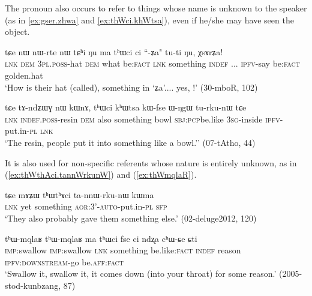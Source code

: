 The pronoun  also occurs to refer to things whose name is unknown to the speaker (as in \ref{ex:gser.zhwa} and \ref{ex:thWci.khWtsa}), even if he/she may have seen the object.
 
\begin{exe}
\ex \label{ex:gser.zhwa}
\gll tɕe nɯ nɯ-rte nɯ tɕʰi ŋu ma tʰɯci ci ``-ʑa" tu-ti ŋu, χsɤrʑa! \\
\textsc{lnk} \textsc{dem} \textsc{3pl}.\textsc{poss}-hat \textsc{dem} what be:\textsc{fact} \textsc{lnk} something \textsc{indef} {  ...} \textsc{ipfv}-say be:\textsc{fact} golden.hat \\
\glt `How is their hat (called), something in `ʑa'.... yes, !' (30-mboR, 102)
\end{exe}

\begin{exe}
\ex \label{ex:thWci.khWtsa}
\gll  tɕe tɤ-ndʑɯɣ nɯ kɯnɤ, tʰɯci kʰɯtsa kɯ-fse ɯ-ŋgɯ tu-rku-nɯ tɕe   \\
\textsc{lnk} \textsc{indef}.\textsc{poss}-resin \textsc{dem} also something bowl \textsc{sbj}:\textsc{pcp}be.like \textsc{3sg}-inside \textsc{ipfv}-put.in-\textsc{pl} \textsc{lnk}   \\
\glt `The resin, people put it into something like a bowl.'' (07-tAtho, 44)
\end{exe}

It is also used for non-specific referents whose nature is entirely unknown, as in  (\ref{ex:thWthAci.tannWrkunW}) and (\ref{ex:thWmqlaR}).

\begin{exe}
\ex \label{ex:thWthAci.tannWrkunW}
\gll   tɕe mɤʑɯ tʰɯtʰɤci ta-nnɯ-rku-nɯ kɯma  \\
\textsc{lnk} yet something \textsc{aor}:3'-\textsc{auto}-put.in-\textsc{pl} \textsc{sfp} \\
\glt `They also probably gave them something else.' (02-deluge2012, 120)
 \end{exe}
 
  \begin{exe}
\ex \label{ex:thWmqlaR}
\gll  tʰɯ-mqlaʁ tʰɯ-mqlaʁ ma tʰɯci fse ci ndʐa cʰɯ-ɕe ɕti \\
 \textsc{imp}:swallow  \textsc{imp}:swallow \textsc{lnk} something be.like:\textsc{fact} \textsc{indef} reason \textsc{ipfv}:\textsc{downstream}-go be.\textsc{aff}:\textsc{fact} \\
\glt `Swallow it, swallow it, it comes down (into your throat) for some reason.' (2005-stod-kunbzang, 87)
  \end{exe}

